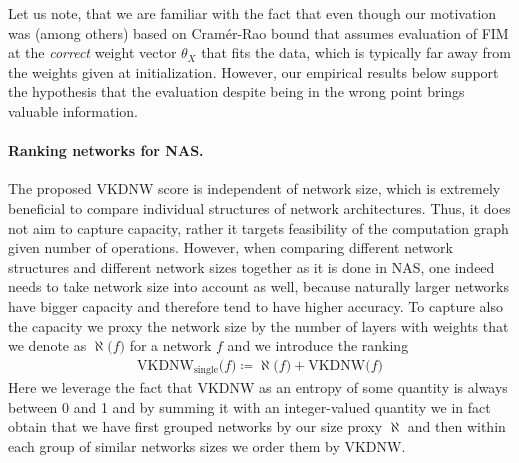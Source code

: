 Let us note, that we are familiar with the fact that even though our motivation was (among others) based on Cramér-Rao bound that assumes evaluation of FIM at the \textit{correct} weight vector $\theta_X$ that fits the data, which is typically far away from the weights given at initialization. However, our empirical results below support the hypothesis that the evaluation despite being in the wrong point brings valuable information.

\paragraph{Ranking networks for NAS.}
The proposed VKDNW score is independent of network size, which is extremely beneficial to compare individual structures of network architectures. Thus, it does not aim to capture capacity, rather it targets feasibility of the computation graph given number of operations. However, when comparing different network structures and different network sizes together as it is done in NAS, one indeed needs to take network size into account as well, because naturally larger networks have bigger capacity and therefore tend to have higher accuracy.  To capture also the capacity we proxy the network size by the number of layers with weights that we denote as $\aleph \big(f\big)$ for a network $f$ and we introduce the ranking
\begin{align}
\text{VKDNW}_{\text{single}}\big(f\big)\coloneq\aleph\big(f\big)+\text{VKDNW}\big(f\big)
\label{eq:vkdnwrank}
\end{align}
%
Here we leverage the fact that VKDNW as an entropy of some quantity is always between 0 and 1 and by summing it with an integer-valued quantity we in fact obtain that we have first grouped networks by our size proxy $\aleph$ and then within each group of similar networks sizes we order them by VKDNW. 
